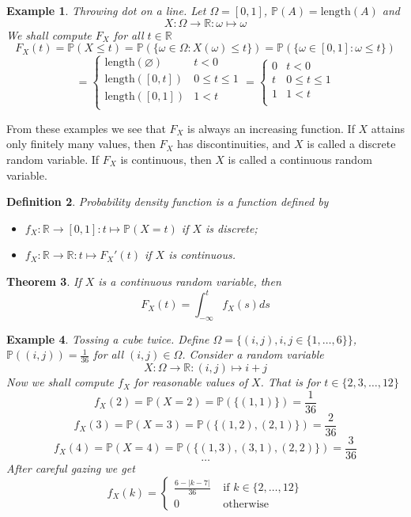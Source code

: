 \documentclass[12pt]{article}
\newtheorem{theorem}{Theorem}[subsection]
\newtheorem{definition}[theorem]{Definition}
\newtheorem{example}[theorem]{Example}
\begin{document}
\begin{example} Throwing dot on a line. Let $\Omega=[0,1]$, $\mathbb{P}(A)=\mbox{length}(A)$ and 
$$
X:\Omega\to\mathbb{R}:\omega\mapsto \omega
$$
We shall compute $F_X$ for all $t\in\mathbb{R}$
$$
F_X(t)
=\mathbb{P}(X\leq t)
=\mathbb{P}(\{\omega\in\Omega:X(\omega)\leq t\})
=\mathbb{P}(\{\omega\in[0,1]:\omega\leq t\})
$$
$$
=\begin{cases}
\mbox{length}(\varnothing)& t < 0\\
\mbox{length}([0,t])& 0\leq t \leq 1\\
\mbox{length}([0,1])& 1 < t\\
\end{cases}
=\begin{cases}
0 & t < 0\\
t & 0\leq t \leq 1\\
1 & 1 < t\\
\end{cases}
$$
\end{example}

From these examples we see that $F_X$ is always an increasing function. If $X$ attains only finitely many values, then $F_X$ has discontinuities, and $X$ is called a discrete random variable. If $F_X$ is continuous, then $X$ is called a continuous random variable.

\begin{definition} Probability density function is a function defined by
\begin{itemize}
    \item $f_X:\mathbb{R}\to [0,1]: t\mapsto \mathbb{P}(X=t)$ if $X$ is discrete;
    \item $f_X:\mathbb{R}\to\mathbb{R}: t\mapsto  F_X'(t) $ if $X$ is continuous.
\end{itemize}
\end{definition}

\begin{theorem} If $X$ is a continuous random variable, then
$$
F_X(t)=\int_{-\infty}^t f_X(s)ds
$$
\end{theorem}

\begin{example} Tossing a cube twice. Define $\Omega=\{(i,j), i,j\in\{1,\ldots,6\}\}$, $\mathbb{P}((i,j))=\frac{1}{36}$ for all $(i,j)\in \Omega$. Consider a random variable
$$
X:\Omega\to\mathbb{R}:(i,j)\mapsto i+j 
$$
Now we shall compute $f_X$ for reasonable values of $X$. That is for $t\in\{2,3,\ldots,12\}$
$$
f_X(2)=\mathbb{P}(X=2)=\mathbb{P}(\{(1,1)\})=\frac{1}{36}
$$
$$
f_X(3)=\mathbb{P}(X=3)=\mathbb{P}(\{(1,2),(2,1)\})=\frac{2}{36}
$$
$$
f_X(4)=\mathbb{P}(X=4)=\mathbb{P}(\{(1,3),(3,1),(2,2)\})=\frac{3}{36}
$$
$$
\ldots
$$
After careful gazing we get
$$
f_X(k)=
\begin{cases}
\frac{6-|k-7|}{36} & \mbox{ if } k\in \{2,\ldots,12\} \\
0 & \mbox{ otherwise }
\end{cases}
$$
\end{example}
\end{document}
